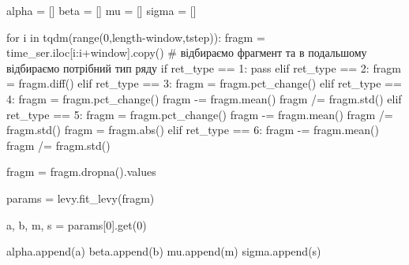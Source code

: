 \documentclass[
  letterpaper,
]{report}
\newenvironment{Shaded}{\begin{snugshade}}{\end{snugshade}}
\newcommand{\BuiltInTok}[1]{\textcolor[rgb]{0.00,0.23,0.31}{#1}}
\newcommand{\CommentTok}[1]{\textcolor[rgb]{0.37,0.37,0.37}{#1}}
\newcommand{\ControlFlowTok}[1]{\textcolor[rgb]{0.00,0.23,0.31}{#1}}
\newcommand{\DecValTok}[1]{\textcolor[rgb]{0.68,0.00,0.00}{#1}}
\newcommand{\KeywordTok}[1]{\textcolor[rgb]{0.00,0.23,0.31}{#1}}
\newcommand{\NormalTok}[1]{\textcolor[rgb]{0.00,0.23,0.31}{#1}}
\newcommand{\OperatorTok}[1]{\textcolor[rgb]{0.37,0.37,0.37}{#1}}
\newcommand{\StringTok}[1]{\textcolor[rgb]{0.13,0.47,0.30}{#1}}
\begin{document}
\begin{Shaded}
\begin{Highlighting}[]
\NormalTok{alpha }\OperatorTok{=}\NormalTok{ []}
\NormalTok{beta }\OperatorTok{=}\NormalTok{ []}
\NormalTok{mu }\OperatorTok{=}\NormalTok{ []}
\NormalTok{sigma }\OperatorTok{=}\NormalTok{ []}
\end{Highlighting}
\end{Shaded}

\begin{Shaded}
\begin{Highlighting}[]
\ControlFlowTok{for}\NormalTok{ i }\KeywordTok{in}\NormalTok{ tqdm(}\BuiltInTok{range}\NormalTok{(}\DecValTok{0}\NormalTok{,length}\OperatorTok{{-}}\NormalTok{window,tstep)):}
\NormalTok{    fragm }\OperatorTok{=}\NormalTok{ time\_ser.iloc[i:i}\OperatorTok{+}\NormalTok{window].copy() }\CommentTok{\# відбираємо фрагмент та в подальшому відбираємо потрібний тип ряду}
    \ControlFlowTok{if}\NormalTok{ ret\_type }\OperatorTok{==} \DecValTok{1}\NormalTok{:}
        \ControlFlowTok{pass}
    \ControlFlowTok{elif}\NormalTok{ ret\_type }\OperatorTok{==} \DecValTok{2}\NormalTok{:}
\NormalTok{        fragm }\OperatorTok{=}\NormalTok{ fragm.diff()}
    \ControlFlowTok{elif}\NormalTok{ ret\_type }\OperatorTok{==} \DecValTok{3}\NormalTok{:}
\NormalTok{        fragm }\OperatorTok{=}\NormalTok{ fragm.pct\_change()}
    \ControlFlowTok{elif}\NormalTok{ ret\_type }\OperatorTok{==} \DecValTok{4}\NormalTok{:}
\NormalTok{        fragm }\OperatorTok{=}\NormalTok{ fragm.pct\_change()}
\NormalTok{        fragm }\OperatorTok{{-}=}\NormalTok{ fragm.mean()}
\NormalTok{        fragm }\OperatorTok{/=}\NormalTok{ fragm.std()}
    \ControlFlowTok{elif}\NormalTok{ ret\_type }\OperatorTok{==} \DecValTok{5}\NormalTok{: }
\NormalTok{        fragm }\OperatorTok{=}\NormalTok{ fragm.pct\_change()}
\NormalTok{        fragm }\OperatorTok{{-}=}\NormalTok{ fragm.mean()}
\NormalTok{        fragm }\OperatorTok{/=}\NormalTok{ fragm.std()}
\NormalTok{        fragm }\OperatorTok{=}\NormalTok{ fragm.}\BuiltInTok{abs}\NormalTok{()}
    \ControlFlowTok{elif}\NormalTok{ ret\_type }\OperatorTok{==} \DecValTok{6}\NormalTok{:}
\NormalTok{        fragm }\OperatorTok{{-}=}\NormalTok{ fragm.mean()}
\NormalTok{        fragm }\OperatorTok{/=}\NormalTok{ fragm.std()}
        
\NormalTok{    fragm }\OperatorTok{=}\NormalTok{ fragm.dropna().values }
    
\NormalTok{    params }\OperatorTok{=}\NormalTok{ levy.fit\_levy(fragm)}
    
\NormalTok{    a, b, m, s }\OperatorTok{=}\NormalTok{ params[}\DecValTok{0}\NormalTok{].get(}\StringTok{\textquotesingle{}0\textquotesingle{}}\NormalTok{)}
    
\NormalTok{    alpha.append(a)}
\NormalTok{    beta.append(b)}
\NormalTok{    mu.append(m)}
\NormalTok{    sigma.append(s)}
\end{Highlighting}
\end{Shaded}
\end{document}
